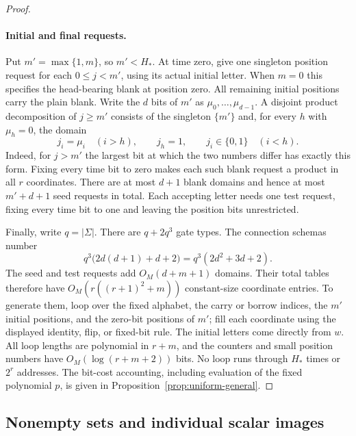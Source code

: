 \begin{proof}
\paragraph{Initial and final requests.}
Put $m'=\max\{1,m\}$, so $m'<H_*$. At time zero, give one singleton
position request for each $0\le j<m'$, using its actual initial letter.
When $m=0$ this specifies the head-bearing blank at position zero.
All remaining initial positions carry the plain blank. Write the
$d$ bits of $m'$ as $\mu_0,\ldots,\mu_{d-1}$. A disjoint product
decomposition of $j\ge m'$ consists of the singleton $\{m'\}$ and,
for every $h$ with $\mu_h=0$, the domain
\begin{equation}\label{eq:computation-blank-domain}
 j_i=\mu_i\quad(i>h),\qquad j_h=1,\qquad
 j_i\in\{0,1\}\quad(i<h).
\end{equation}
Indeed, for $j>m'$ the largest bit at which the two numbers differ has
exactly this form. Fixing every time bit to zero makes each such blank
request a product in all $r$ coordinates. There are at most $d+1$ blank
domains and hence at most $m'+d+1$ seed requests in total. Each accepting
letter needs one test request, fixing every time bit to one and leaving
the position bits unrestricted.

Finally, write $q=|\Sigma|$. There are $q+2q^3$ gate types. The connection
schemas number
\begin{equation}\label{eq:computation-schema-count}
 q^3\bigl(2d(d+1)+d+2\bigr)=q^3(2d^2+3d+2).
\end{equation}
The seed and test requests add $O_M(d+m+1)$ domains. Their total tables
therefore have $O_M(r((r+1)^2+m))$ constant-size coordinate entries.
To generate them, loop over the fixed alphabet, the carry or borrow
indices, the $m'$ initial positions, and the zero-bit positions of $m'$;
fill each coordinate using the displayed identity, flip, or fixed-bit
rule. The initial letters come directly from $w$. All loop lengths are
polynomial in $r+m$, and the counters and small position numbers have
$O_M(\log(r+m+2))$ bits. No loop runs through $H_*$ times or $2^r$
addresses. The bit-cost accounting, including evaluation of the fixed
polynomial $p$, is given in Proposition~\ref{prop:uniform-general}.
\end{proof}

\subsection{Nonempty sets and individual scalar images}\label{sec:consistency}


